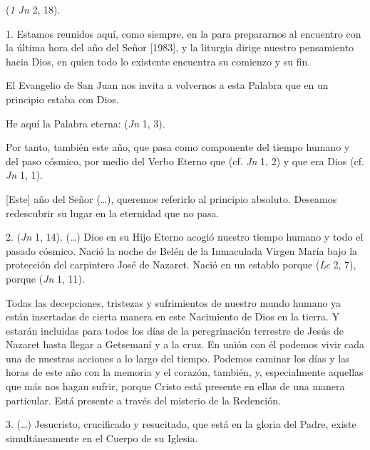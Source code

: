 				\begin{body}
					 (\emph{1 Jn} 2, 18).
					
					1. Estamos reunidos aquí, como siempre, en la  para prepararnos al encuentro con la última hora del año del Señor {[}1983{]}, y la liturgia dirige nuestro pensamiento hacia Dios, en quien todo lo existente encuentra su comienzo y su fin.
					
					El Evangelio de San Juan nos invita a volvernos a esta Palabra que en un principio estaba con Dios.
					
					He aquí la Palabra eterna:  (\emph{Jn} 1, 3).
					
					Por tanto, también este año, que pasa como componente del tiempo humano y del paso cósmico,  por medio del Verbo Eterno que  (cf. \emph{Jn} 1, 2) y que era Dios (cf. \emph{Jn} 1, 1).
					
					{[}Este{]} año del Señor (\ldots{}), queremos referirlo al principio absoluto. Deseamos redescubrir su lugar en la eternidad que no pasa.
					
					2.  (\emph{Jn} 1, 14). (\ldots{}) Dios en su Hijo Eterno acogió nuestro tiempo humano y todo el pasado cósmico. Nació la noche de Belén de la Inmaculada Virgen María bajo la protección del carpintero José de Nazaret. Nació en un establo porque  (\emph{Lc} 2, 7), porque  (\emph{Jn} 1, 11).
					
					Todas las decepciones, tristezas y sufrimientos de nuestro mundo humano ya están insertadas de cierta manera en este Nacimiento de Dios en la tierra. Y estarán incluidas para todos los días de la peregrinación terrestre de Jesús de Nazaret hasta llegar a Getsemaní y a la cruz. En unión con él podemos vivir cada una de nuestras acciones a lo largo del tiempo. Podemos caminar los días y las horas de este año con la memoria y el corazón, también, y, especialmente aquellas que más nos hagan sufrir, porque Cristo está presente en ellas de una manera particular. Está presente a través del misterio de la Redención.
					
					3. (\ldots{}) Jesucristo, crucificado y resucitado, que está en la gloria del Padre, existe simultáneamente en el Cuerpo de su Iglesia.
					

\end{body}
